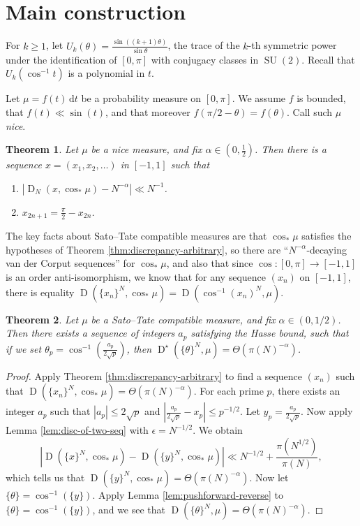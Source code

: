 \documentclass{article}
\DeclareMathOperator{\D}{D}
\DeclareMathOperator{\SU}{SU}
\newcommand{\dd}{\mathrm{d}}
\newtheorem{theorem}{Theorem}
\begin{document}
\section{Main construction}

For $k\geqslant 1$, let 
$U_k(\theta) = \frac{\sin((k+1)\theta)}{\sin\theta}$, the trace of the $k$-th 
symmetric power under the identification of $[0,\pi]$ with conjugacy classes 
in $\SU(2)$. Recall that $U_k(\cos^{-1} t)$ is a polynomial in $t$. 

Let $\mu = f(t)\, \dd t$ be a probability measure on $[0,\pi]$. We assume 
$f$ is bounded, that $f(t) \ll \sin(t)$, and that moreover 
$f(\pi/2-\theta) = f(\theta)$. Call such $\mu$ \emph{nice}. 

\begin{theorem}
Let $\mu$ be a nice measure, and fix $\alpha\in \left(0,\frac 1 2\right)$. Then 
there is a sequence $x = (x_1,x_2,\dots)$ in $[-1,1]$ such that 
\begin{enumerate}
\item
$\left|\D_N(x,\cos_\ast\mu) - N^{-\alpha}\right| \ll N^{-1}$.

\item
$x_{2n+1} = \frac \pi 2 - x_{2n}$. 
\end{enumerate}
\end{theorem}

The key facts about Sato--Tate compatible measures are that $\cos_\ast\mu$ 
satisfies the hypotheses of Theorem \ref{thm:discrepancy-arbitrary}, so 
there are ``$N^{-\alpha}$-decaying van der Corput sequences'' for 
$\cos_\ast\mu$, and also that since $\cos\colon [0,\pi] \to [-1,1]$ is an 
order anti-isomorphism, we know that for any sequence $(x_n)$ on $[-1,1]$, there 
is equality $\D(\{x_n\}^N,\cos_\ast\mu) = \D(\cos^{-1}(x_n)^N,\mu)$. 


\begin{theorem}\label{thm:integral-a_p-alpha}
Let $\mu$ be a Sato--Tate compatible measure, and fix $\alpha\in (0,1/2)$. 
Then there exists a sequence of integers $a_p$ satisfying the Hasse bound, 
such that if we set $\theta_p = \cos^{-1}\left(\frac{a_p}{2\sqrt p}\right)$, 
then $\D^\star(\{\theta\}^N,\mu) = \Theta(\pi(N)^{-\alpha})$. 
\end{theorem}
\begin{proof}
Apply Theorem \ref{thm:discrepancy-arbitrary} to find a sequence $(x_n)$ such 
that $\D(\{x_n\}^N,\cos_\ast \mu) = \Theta(\pi(N)^{-\alpha})$. For each prime 
$p$, there exists an integer $a_p$ such that $|a_p|\leqslant 2\sqrt p$ and 
$\left| \frac{a_p}{2\sqrt p} - x_p\right| \leqslant p^{-1/2}$. Let 
$y_p = \frac{a_p}{2\sqrt p}$. Now apply 
Lemma \ref{lem:disc-of-two-seq} with $\epsilon = N^{-1/2}$. We obtain 
\[
	\left| \D(\{x\}^N,\cos_\ast \mu) - \D(\{y\}^N, \cos_\ast \mu)\right| \ll  N^{-1/2} + \frac{\pi(N^{1/2})}{\pi(N)} ,
\]
which tells us that $\D(\{y\}^N,\cos_\ast\mu) = \Theta(\pi(N)^{-\alpha})$. 
Now let $\{\theta\} = \cos^{-1}(\{y\})$. Apply Lemma \ref{lem:pushforward-reverse} to 
$\{\theta\} = \cos^{-1}(\{y\})$, and we see that 
$\D(\{\theta\}^N,\mu) = \Theta(\pi(N)^{-\alpha})$. 
\end{proof}
\end{document}
